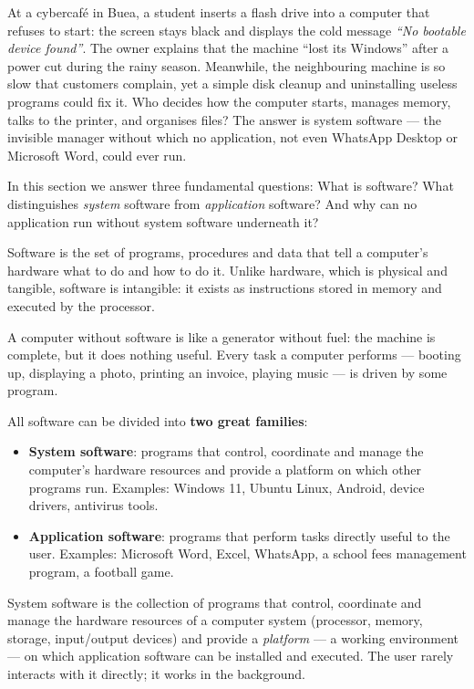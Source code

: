 \documentclass[11pt]{article}
\newcommand{\cle}[1]{{\popxbold\color{popdark}#1}}
\newcounter{popsec}
\newcounter{popsub}
\newcommand{\courssub}[1]{%
  \stepcounter{popsub}%
  \par\vspace{9pt}\noindent{\popxbold\fontsize{11.5}{13}\selectfont\color{popink}{\color{poporange}\thepopsec.\thepopsub}\hspace{6pt}#1}\par\nopagebreak\vspace{4pt}
}
\begin{document}
At a cybercafé in Buea, a student inserts a flash drive into a computer that refuses to start: the screen stays black and displays the cold message \emph{``No bootable device found''}. The owner explains that the machine ``lost its Windows'' after a power cut during the rainy season. Meanwhile, the neighbouring machine is so slow that customers complain, yet a simple disk cleanup and uninstalling useless programs could fix it. Who decides how the computer starts, manages memory, talks to the printer, and organises files? The answer is \cle{system software} --- the invisible manager without which no application, not even WhatsApp Desktop or Microsoft Word, could ever run.

In this section we answer three fundamental questions: What is software? What distinguishes \emph{system} software from \emph{application} software? And why can no application run without system software underneath it?

\courssub{Software and Its Two Great Families}

\begin{definition}[Software]
\cle{Software} is the set of programs, procedures and data that tell a computer's hardware what to do and how to do it. Unlike hardware, which is physical and tangible, software is intangible: it exists as instructions stored in memory and executed by the processor.
\end{definition}

A computer without software is like a generator without fuel: the machine is complete, but it does nothing useful. Every task a computer performs --- booting up, displaying a photo, printing an invoice, playing music --- is driven by some program.

All software can be divided into \textbf{two great families}:

\begin{itemize}
\item \textbf{System software}: programs that control, coordinate and manage the computer's hardware resources and provide a platform on which other programs run. Examples: Windows 11, Ubuntu Linux, Android, device drivers, antivirus tools.
\item \textbf{Application software}: programs that perform tasks directly useful to the user. Examples: Microsoft Word, Excel, WhatsApp, a school fees management program, a football game.
\end{itemize}

\begin{definition}
\cle{System software} is the collection of programs that control, coordinate and manage the hardware resources of a computer system (processor, memory, storage, input/output devices) and provide a \emph{platform} --- a working environment --- on which application software can be installed and executed. The user rarely interacts with it directly; it works in the background.
\end{definition}
\end{document}
